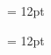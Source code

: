\documentclass[gps1,twoside]{article}
\begin{document}
\pagestyle{fancy} 
\begin{spacing}{0.916666666666667}\begin{center}\begin{center}

 \label{PageStock_HangingIndent1} \end{center}
\end{center}\end{spacing}\setlength{\columnsep}{12pt} 
\setlength\columnseprule{0.4pt} 
\begin{multicols}{2}\begin{spacing}{0.458333333333333}{\raggedright} \begin{spacing}{0.458333333333333}
\hangindent= 12pt
 \headwordafterentryletDatadicBody{}\spanenpronunciationggofonipaxemicspanentryletDatadicBody{[}\spanenpronunciationggofonipaxemicspanentryletDatadicBody{]}  \grammaticalinfoaftersensespanentryletDatadicBody{}  \end{spacing}
\begin{spacing}{0.458333333333333}
\hangindent= 12pt

\end{spacing}
\end{spacing}
\end{multicols}
\end{document}
